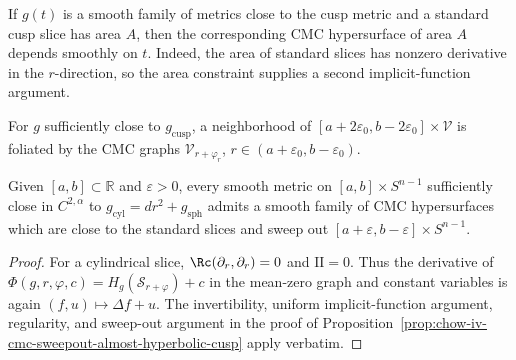\begin{remark}
\label{rem:chow-iv-cmc-fixed-area-smooth-dependence}
If \(g(t)\) is a smooth family of metrics close to the cusp metric and a
standard cusp slice has area \(A\), then the corresponding CMC hypersurface of
area \(A\) depends smoothly on \(t\).  Indeed, the area of standard slices has
nonzero derivative in the \(r\)-direction, so the area constraint supplies a
second implicit-function argument.
\end{remark}

\begin{claim}
\label{clm:chow-iv-cmc-cusp-graphs-foliate}
For \(g\) sufficiently close to \(g_{\mathrm{cusp}}\), a neighborhood of
\([a+2\varepsilon_0,b-2\varepsilon_0]\times\mathcal V\) is foliated by the
CMC graphs \(\mathcal V_{r+\varphi_r}\),
\(r\in(a+\varepsilon_0,b-\varepsilon_0)\).
\end{claim}

\begin{proposition}
\label{prop:chow-iv-cmc-spheres-almost-cylindrical-neck}
Given \([a,b]\subset\mathbb R\) and \(\varepsilon>0\), every smooth metric on
\([a,b]\times S^{n-1}\) sufficiently close in \(C^{2,\alpha}\) to
\(g_{\mathrm{cyl}}=dr^2+g_{\mathrm{sph}}\) admits a smooth family of CMC
hypersurfaces which are close to the standard slices and sweep out
\([a+\varepsilon,b-\varepsilon]\times S^{n-1}\).
\end{proposition}
\begin{proof}
\sketch
For a cylindrical slice, \(\Rc(\partial_r,\partial_r)=0\) and
\(\mathrm{II}=0\).  Thus the derivative of
\(\Phi(g,r,\varphi,c)=H_g(\mathcal S_{r+\varphi})+c\) in the mean-zero graph
and constant variables is again \((f,u)\mapsto\Delta f+u\).  The invertibility,
uniform implicit-function argument, regularity, and sweep-out argument in the
proof of Proposition~\ref{prop:chow-iv-cmc-sweepout-almost-hyperbolic-cusp}
apply verbatim.
\end{proof}

